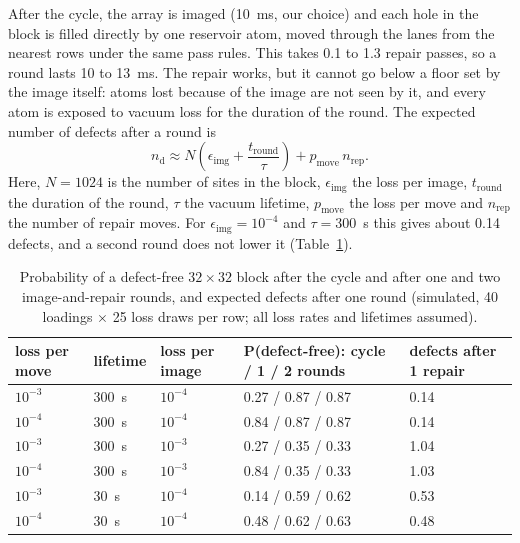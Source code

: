 After the cycle, the array is imaged (10~ms, our choice) and each hole in the block is filled directly by one reservoir atom, moved through the lanes from the nearest rows under the same pass rules. This takes 0.1 to 1.3 repair passes, so a round lasts 10 to 13~ms. The repair works, but it cannot go below a floor set by the image itself: atoms lost because of the image are not seen by it, and every atom is exposed to vacuum loss for the duration of the round. The expected number of defects after a round is
\begin{equation}
  n_\mathrm{d} \approx N\left(\epsilon_\mathrm{img} + \frac{t_\mathrm{round}}{\tau}\right) + p_\mathrm{move}\, n_\mathrm{rep}.
  \label{eq:rearrange-floor}
\end{equation}
Here, $N=1024$ is the number of sites in the block, $\epsilon_\mathrm{img}$ the loss per image, $t_\mathrm{round}$ the duration of the round, $\tau$ the vacuum lifetime, $p_\mathrm{move}$ the loss per move and $n_\mathrm{rep}$ the number of repair moves. For $\epsilon_\mathrm{img}=10^{-4}$ and $\tau=300$~s this gives about 0.14 defects, and a second round does not lower it (Table~\ref{tab:rearrange-repair}).

\begin{table}[htbp]\centering\small
\caption{Probability of a defect-free $32\times32$ block after the cycle and after one and two image-and-repair rounds, and expected defects after one round (simulated, 40 loadings $\times$ 25 loss draws per row; all loss rates and lifetimes assumed).}
\label{tab:rearrange-repair}
\setlength{\tabcolsep}{3.5pt}
\begin{tabular}{lllll}
\toprule
loss per move & lifetime & loss per image & P(defect-free): cycle / 1 / 2 rounds & defects after 1 repair \\
\midrule
$10^{-3}$ & 300~s & $10^{-4}$ & 0.27 / 0.87 / 0.87 & 0.14 \\
$10^{-4}$ & 300~s & $10^{-4}$ & 0.84 / 0.87 / 0.87 & 0.14 \\
$10^{-3}$ & 300~s & $10^{-3}$ & 0.27 / 0.35 / 0.33 & 1.04 \\
$10^{-4}$ & 300~s & $10^{-3}$ & 0.84 / 0.35 / 0.33 & 1.03 \\
$10^{-3}$ & 30~s & $10^{-4}$ & 0.14 / 0.59 / 0.62 & 0.53 \\
$10^{-4}$ & 30~s & $10^{-4}$ & 0.48 / 0.62 / 0.63 & 0.48 \\
\bottomrule
\end{tabular}
\end{table}

